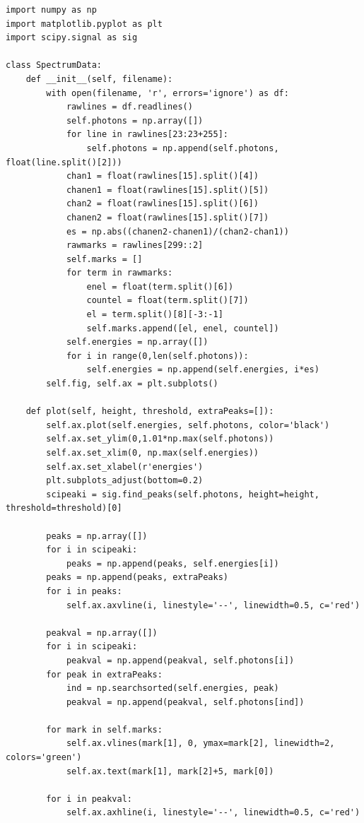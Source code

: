 \documentclass[8pt, a4paper]{article}
\begin{document}
\begin{verbatim}
import numpy as np
import matplotlib.pyplot as plt
import scipy.signal as sig

class SpectrumData:
    def __init__(self, filename):
        with open(filename, 'r', errors='ignore') as df:
            rawlines = df.readlines()
            self.photons = np.array([])
            for line in rawlines[23:23+255]:
                self.photons = np.append(self.photons, float(line.split()[2]))
            chan1 = float(rawlines[15].split()[4])
            chanen1 = float(rawlines[15].split()[5])
            chan2 = float(rawlines[15].split()[6])
            chanen2 = float(rawlines[15].split()[7])
            es = np.abs((chanen2-chanen1)/(chan2-chan1))
            rawmarks = rawlines[299::2]
            self.marks = []
            for term in rawmarks:
                enel = float(term.split()[6])
                countel = float(term.split()[7])
                el = term.split()[8][-3:-1]
                self.marks.append([el, enel, countel])
            self.energies = np.array([])
            for i in range(0,len(self.photons)):
                self.energies = np.append(self.energies, i*es)
        self.fig, self.ax = plt.subplots()

    def plot(self, height, threshold, extraPeaks=[]):
        self.ax.plot(self.energies, self.photons, color='black')
        self.ax.set_ylim(0,1.01*np.max(self.photons))
        self.ax.set_xlim(0, np.max(self.energies))
        self.ax.set_xlabel(r'energies')
        plt.subplots_adjust(bottom=0.2)
        scipeaki = sig.find_peaks(self.photons, height=height, threshold=threshold)[0]

        peaks = np.array([])
        for i in scipeaki:
            peaks = np.append(peaks, self.energies[i])
        peaks = np.append(peaks, extraPeaks)
        for i in peaks:
            self.ax.axvline(i, linestyle='--', linewidth=0.5, c='red')

        peakval = np.array([])
        for i in scipeaki:
            peakval = np.append(peakval, self.photons[i])
        for peak in extraPeaks:
            ind = np.searchsorted(self.energies, peak)
            peakval = np.append(peakval, self.photons[ind])

        for mark in self.marks:
            self.ax.vlines(mark[1], 0, ymax=mark[2], linewidth=2, colors='green')
            self.ax.text(mark[1], mark[2]+5, mark[0])

        for i in peakval:
            self.ax.axhline(i, linestyle='--', linewidth=0.5, c='red')


\end{verbatim}
\end{document}
